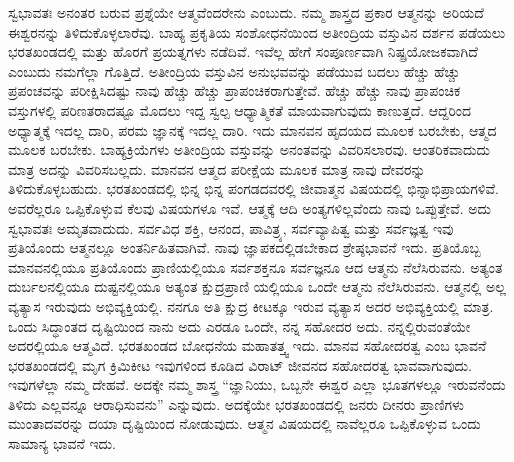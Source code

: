ಸ್ವಭಾವತಃ ಅನಂತರ ಬರುವ ಪ್ರಶ್ನೆಯೇ ಆತ್ಮವೆಂದರೇನು ಎಂಬುದು. ನಮ್ಮ ಶಾಸ್ತ್ರದ ಪ್ರಕಾರ ಆತ್ಮನನ್ನು ಅರಿಯದೆ ಈಶ್ವರನನ್ನು ತಿಳಿದುಕೊಳ್ಳಲಾರೆವು. ಬಾಹ್ಯ ಪ್ರಕೃತಿಯ ಸಂಶೋಧನೆಯಿಂದ ಅತೀಂದ್ರಿಯ ವಸ್ತುವಿನ ದರ್ಶನ ಪಡೆಯಲು ಭರತಖಂಡದಲ್ಲಿ ಮತ್ತು ಹೊರಗೆ ಪ್ರಯತ್ನಗಳು ನಡೆದಿವೆ. ಇವೆಲ್ಲ ಹೇಗೆ ಸಂಪೂರ್ಣವಾಗಿ ನಿಷ್ಪ್ರಯೋಜಕವಾಗಿದೆ ಎಂಬುದು ನಮಗೆಲ್ಲಾ ಗೊತ್ತಿದೆ. ಅತೀಂದ್ರಿಯ ವಸ್ತುವಿನ ಅನುಭವವನ್ನು ಪಡೆಯುವ ಬದಲು ಹೆಚ್ಚು ಹೆಚ್ಚು ಪ್ರಪಂಚವನ್ನು ಪರೀಕ್ಷಿಸಿದಷ್ಟು ನಾವು ಹೆಚ್ಚು ಹೆಚ್ಚು ಪ್ರಾಪಂಚಿಕರಾಗುತ್ತೇವೆ. ಹೆಚ್ಚು ಹೆಚ್ಚು ನಾವು ಪ್ರಾಪಂಚಿಕ ವಸ್ತುಗಳಲ್ಲಿ ಪರಿಣತರಾದಷ್ಟೂ ಮೊದಲು ಇದ್ದ ಸ್ವಲ್ಪ ಆಧ್ಯಾತ್ಮಿಕತೆ ಮಾಯವಾಗುವುದು ಕಾಣುತ್ತದೆ. ಆದ್ದರಿಂದ ಅಧ್ಯಾತ್ಮಕ್ಕೆ ಇದಲ್ಲ ದಾರಿ, ಪರಮ ಜ್ಞಾನಕ್ಕೆ ಇದಲ್ಲ ದಾರಿ. ಇದು ಮಾನವನ ಹೃದಯದ ಮೂಲಕ ಬರಬೇಕು, ಆತ್ಮದ ಮೂಲಕ ಬರಬೇಕು. ಬಾಹ್ಯಕ್ರಿಯೆಗಳು ಅತೀಂದ್ರಿಯ ವಸ್ತುವನ್ನು ಅನಂತವನ್ನು ವಿವರಿಸಲಾರವು. ಆಂತರಿಕವಾದುದು ಮಾತ್ರ ಅದನ್ನು ವಿವರಿಸಬಲ್ಲದು. ಮಾನವನ ಆತ್ಮದ ಪರೀಕ್ಷೆಯ ಮೂಲಕ ಮಾತ್ರ ನಾವು ದೇವರನ್ನು ತಿಳಿದುಕೊಳ್ಳಬಹುದು. ಭರತಖಂಡದಲ್ಲಿ ಭಿನ್ನ ಭಿನ್ನ ಪಂಗಡದವರಲ್ಲಿ ಜೀವಾತ್ಮನ ವಿಷಯದಲ್ಲಿ ಭಿನ್ನಾಭಿಪ್ರಾಯಗಳಿವೆ. ಅವರೆಲ್ಲರೂ ಒಪ್ಪಿಕೊಳ್ಳುವ ಕೆಲವು ವಿಷಯಗಳೂ ಇವೆ. ಆತ್ಮಕ್ಕೆ ಆದಿ ಅಂತ್ಯಗಳಿಲ್ಲವೆಂದು ನಾವು ಒಪ್ಪುತ್ತೇವೆ. ಅದು ಸ್ವಭಾವತಃ ಅಮೃತವಾದುದು. ಸರ್ವವಿಧ ಶಕ್ತಿ, ಆನಂದ, ಪಾವಿತ್ರ್ಯ, ಸರ್ವವ್ಯಾಪಿತ್ವ ಮತ್ತು ಸರ್ವಜ್ಞತ್ವ ಇವು ಪ್ರತಿಯೊಂದು ಆತ್ಮನಲ್ಲೂ ಅಂತರ್ನಿಹಿತವಾಗಿವೆ. ನಾವು ಜ್ಞಾಪಕದಲ್ಲಿಡಬೇಕಾದ ಶ್ರೇಷ್ಠಭಾವನೆ ಇದು. ಪ್ರತಿಯೊಬ್ಬ ಮಾನವನಲ್ಲಿಯೂ ಪ್ರತಿಯೊಂದು ಪ್ರಾಣಿಯಲ್ಲಿಯೂ ಸರ್ವಶಕ್ತನೂ ಸರ್ವಜ್ಞನೂ ಆದ ಆತ್ಮನು ನೆಲೆಸಿರುವನು. ಅತ್ಯಂತ ದುರ್ಬಲನಲ್ಲಿಯೂ ದುಷ್ಟನಲ್ಲಿಯೂ ಅತ್ಯಂತ ಕ್ಷುದ್ರಪ್ರಾಣಿ\- ಯಲ್ಲಿಯೂ ಒಂದೇ ಆತ್ಮನು ನೆಲೆಸಿರುವನು. ಆತ್ಮನಲ್ಲಿ ಅಲ್ಲ ವ್ಯತ್ಯಾಸ ಇರುವುದು ಅಭಿವ್ಯಕ್ತಿಯಲ್ಲಿ. ನನಗೂ ಅತಿ ಕ್ಷುದ್ರ ಕೀಟಕ್ಕೂ ಇರುವ ವ್ಯತ್ಯಾಸ ಅದರ ಅಭಿವ್ಯಕ್ತಿಯಲ್ಲಿ ಮಾತ್ರ. ಒಂದು ಸಿದ್ಧಾಂತದ ದೃಷ್ಟಿಯಿಂದ ನಾನು ಅದು ಎರಡೂ ಒಂದೇ, ನನ್ನ ಸಹೋದರ ಅದು. ನನ್ನಲ್ಲಿರುವಂತೆಯೇ ಅದರಲ್ಲಿಯೂ ಆತ್ಮವಿದೆ. ಭರತಖಂಡದ ಬೋಧನೆಯ ಮಹಾತತ್ತ್ವ ಇದು. ಮಾನವ ಸಹೋದರತ್ವ ಎಂಬ ಭಾವನೆ ಭರತಖಂಡದಲ್ಲಿ ಮೃಗ ಕ್ರಿಮಿಕೀಟ ಇವುಗಳಿಂದ ಕೂಡಿದ ವಿರಾಟ್​ ಜೀವನದ ಸಹೋದರತ್ವ ಭಾವವಾಗುವುದು. ಇವುಗಳೆಲ್ಲಾ ನಮ್ಮ ದೇಹವೆ. ಅದಕ್ಕೇ ನಮ್ಮ ಶಾಸ್ತ್ರ “ಜ್ಞಾನಿಯು, ಒಬ್ಬನೇ ಈಶ್ವರ ಎಲ್ಲಾ ಭೂತಗಳಲ್ಲೂ ಇರುವನೆಂದು ತಿಳಿದು ಎಲ್ಲವನ್ನೂ ಆರಾಧಿಸುವನು” ಎನ್ನುವುದು. ಅದಕ್ಕೆಯೇ ಭರತಖಂಡದಲ್ಲಿ ಜನರು ದೀನರು ಪ್ರಾಣಿಗಳು ಮುಂತಾದವರನ್ನು ದಯಾ ದೃಷ್ಟಿಯಿಂದ ನೋಡುವುದು. ಆತ್ಮನ ವಿಷಯದಲ್ಲಿ ನಾವೆಲ್ಲರೂ ಒಪ್ಪಿಕೊಳ್ಳುವ ಒಂದು ಸಾಮಾನ್ಯ ಭಾವನೆ ಇದು.

